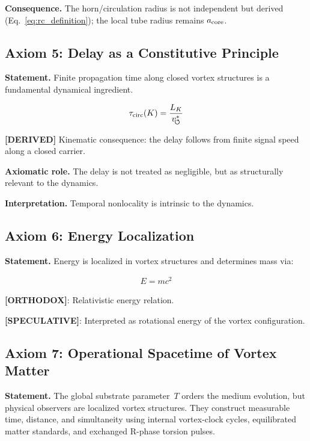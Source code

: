 \documentclass[11pt]{article}
\theoremstyle{definition}
\theoremstyle{plain}
\theoremstyle{remark}
\newcommand{\vchar}{v_{\!\boldsymbol{\circlearrowleft}}^{\ast}}
\begin{document}
        \textbf{Consequence.}
        The horn/circulation radius is not independent but derived (Eq.~\ref{eq:rc_definition}); the local tube radius remains $a_{\rm core}$.
    
    \subsection{Axiom 5: Delay as a Constitutive Principle}
        
        \textbf{Statement.}
        Finite propagation time along closed vortex structures is a fundamental dynamical ingredient.
        
        \begin{align}
            \tau_{\rm circ}(K) = \frac{L_K}{\vchar}
        \end{align}
        
        \textbf{[DERIVED]} Kinematic consequence: the delay follows from finite signal speed along a closed carrier.

        \textbf{Axiomatic role.} The delay is not treated as negligible, but as structurally relevant to the dynamics.
        
        \textbf{Interpretation.}
        Temporal nonlocality is intrinsic to the dynamics.
    
    \subsection{Axiom 6: Energy Localization}
        
        \textbf{Statement.}
        Energy is localized in vortex structures and determines mass via:
        
        \begin{align}
            E = m c^2
        \end{align}
        
        \textbf{[ORTHODOX]}: Relativistic energy relation.
        
        \textbf{[SPECULATIVE]}: Interpreted as rotational energy of the vortex configuration.
    
    \subsection{Axiom 7: Operational Spacetime of Vortex Matter}
        \label{axiom:operational_spacetime_vortex_matter}

        \textbf{Statement.}
        The global substrate parameter~\(T\) orders the medium evolution, but physical observers are localized vortex structures. They construct measurable time, distance, and simultaneity using internal vortex-clock cycles, equilibrated matter standards, and exchanged R-phase torsion pulses.
\end{document}
